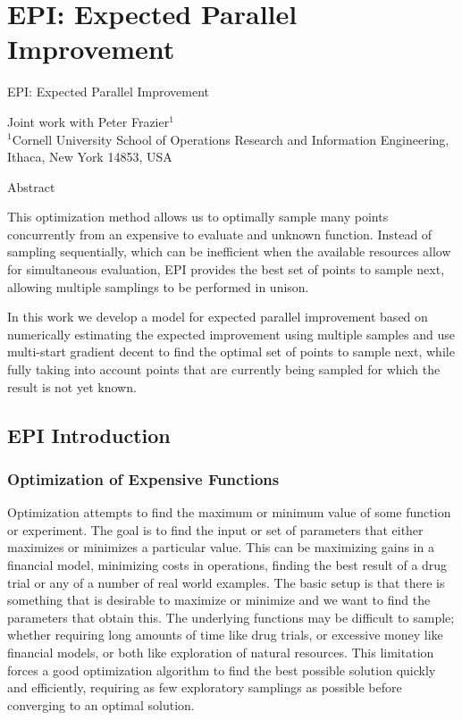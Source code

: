 \documentclass[phd,tocprelim]{cornell}
\begin{document}


\part{EPI: Expected Parallel Improvement} %
\label{prt:EPI: Expected Parallel Improvement}
\singlespacing

\noindent
\Large
EPI: Expected Parallel Improvement

\noindent
\normalsize
Joint work with Peter Frazier$^{1}$ \\
\scriptsize
$^{1}$Cornell University School of Operations Research and Information Engineering, Ithaca, New York 14853, USA
\normalsize

\normalspacing

\begin{center}
   Abstract 
\end{center}

This optimization method allows us to optimally sample many points concurrently from an expensive to evaluate and unknown function. Instead of sampling sequentially, which can be inefficient when the available resources allow for simultaneous evaluation, EPI provides the best set of points to sample next, allowing multiple samplings to be performed in unison.

In this work we develop a model for expected parallel improvement based on numerically estimating the expected improvement using multiple samples and use multi-start gradient decent to find the optimal set of points to sample next, while fully taking into account points that are currently being sampled for which the result is not yet known.

\chapter{EPI Introduction} %
\label{cha:EPI Introduction}

\section{Optimization of Expensive Functions}

Optimization attempts to find the maximum or minimum value of some function or experiment. The goal is to find the input or set of parameters that either maximizes or minimizes a particular value. This can be maximizing gains in a financial model, minimizing costs in operations, finding the best result of a drug trial or any of a number of real world examples. The basic setup is that there is something that is desirable to maximize or minimize and we want to find the parameters that obtain this. The underlying functions may be difficult to sample; whether requiring long amounts of time like drug trials, or excessive money like financial models, or both like exploration of natural resources. This limitation forces a good optimization algorithm to find the best possible solution quickly and efficiently, requiring as few exploratory samplings as possible before converging to an optimal solution.
\end{document}
